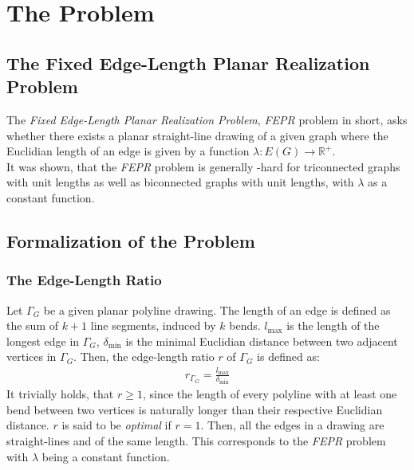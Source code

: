 \section{The Problem}\label{section:initial_situation}

\subsection{The Fixed Edge-Length Planar Realization Problem}

The \emph{Fixed Edge-Length Planar Realization Problem}, \emph{FEPR} problem in short, asks whether there exists a planar straight-line drawing of a given graph where the Euclidian length of an edge is given by a function $\lambda: E(G) \to \mathbb{R}^+$.
\\
It was shown, that the \emph{FEPR} problem is generally \NP-hard for triconnected graphs with unit lengths as well as biconnected graphs with unit lengths, with $\lambda$ as a constant function. \cite[P. 2]{straight-line_2-trees}

\subsection{Formalization of the Problem}
\subsubsection*{The Edge-Length Ratio}
Let $\Gamma_G$ be a given planar polyline drawing. The length of an edge is defined as the sum of $k+1$ line segments, induced by $k$ bends. $l_{\max}$ is the length of the longest edge in $\Gamma_G$, $\delta_{\min}$ is the minimal Euclidian distance between two adjacent vertices in $\Gamma_G$. Then, the edge-length ratio $r$ of $\Gamma_G$ is defined as:
\begin{align}
	r_{\Gamma_G} = \frac{l_{\max}}{\delta_{\min}} 
\end{align}
It trivially holds, that $r\geq1$, since the length of every polyline with at least one bend between two vertices is naturally longer than their respective Euclidian distance. $r$ is said to be \emph{optimal} if $r=1$. Then, all the edges in a drawing are straight-lines and of the same length. This corresponds to the \emph{FEPR} problem with $\lambda$ being a constant function.
